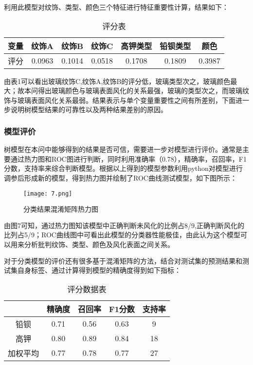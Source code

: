 利用此模型对纹饰、类型、颜色三个特征进行特征重要性计算，结果如下：

\begin{table}[H]
	\centering
	\begin{tabular}{c c c c c c c} 
        \toprule[1.5pt]
		变量 & 纹饰A & 纹饰B & 纹饰C & 高钾类型 & 铅钡类型 & 颜色 \\ 
	    \midrule[1pt]
		评分 & 0.0963 & 0.1014 & 0.0518 & 0.1708 & 0.1809 & 0.3987 \\
        \toprule[1.5pt]
	\end{tabular}
\caption{评分表}
\end{table}



由表1可以看出玻璃纹饰C,纹饰A,纹饰B的评分低，玻璃类型次之，玻璃颜色最大；故本问得出玻璃颜色与玻璃表面风化的关系最强，玻璃的类型次之，而玻璃纹饰与玻璃表面风化关系最弱。结果表示与单个变量重要性之间有所差别，下面进一步说明树模型结果的可靠性以及两种结果差别的原因。

\subsubsection{模型评价}

树模型在本问中能够得到的结果是否可信，需要进一步对模型进行评价。通常是主要通过热力图和ROC图进行判断，同时利用准确率（0.78），精确率，召回率，F1分数，支持率来综合判断模型。根据以上得到的模型参数利用python对模型进行调参后形成新的模型，得到热力图并绘制了ROC曲线测试模型，如下图所示：


\begin{figure}[H] 
	\centering %
	\texttt{[image: 7.png]} %
	\caption{分类结果混淆矩阵热力图} %
	\label{Fig.main8} %
\end{figure}

由图7可知，通过热力图知该模型中正确判断未风化的比例占8/9,正确判断风化的比列占5/9；ROC曲线图中可看出此模型的分类器性能极佳，由此认为这个模型可以用来分析批判纹饰、类型、颜色及风化表面之间关系。

对于分类模型的评价还有很多基于混淆矩阵的方法，结合对测试集的预测结果和测试集自身标签、通过计算得到模型的精确度得到如下指标：
\begin{table}[H]
	\centering
	\begin{tabular}{c c c c c} 
		\toprule[1.5pt]
			 & 精确度 & 召回率 & F1分数 & 支持率 \\ 
		\midrule[1pt]
		铅钡 &	0.71 &	0.56 &	0.63 &	9 \\
		高钾 & 	0.80 &	0.89 &	0.84 &	18 \\
		加权平均 &	0.77 &	0.78 &	0.77 &	27 \\
		\toprule[1.5pt]
	\end{tabular}
	\caption{评分数据表}
\end{table}


